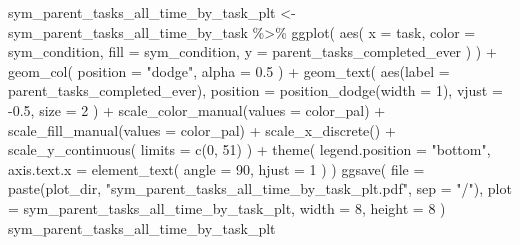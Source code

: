 \documentclass[
]{book}
\newenvironment{Shaded}{\begin{snugshade}}{\end{snugshade}}
\newcommand{\AttributeTok}[1]{\textcolor[rgb]{0.77,0.63,0.00}{#1}}
\newcommand{\DecValTok}[1]{\textcolor[rgb]{0.00,0.00,0.81}{#1}}
\newcommand{\FloatTok}[1]{\textcolor[rgb]{0.00,0.00,0.81}{#1}}
\newcommand{\FunctionTok}[1]{\textcolor[rgb]{0.00,0.00,0.00}{#1}}
\newcommand{\NormalTok}[1]{#1}
\newcommand{\OtherTok}[1]{\textcolor[rgb]{0.56,0.35,0.01}{#1}}
\newcommand{\SpecialCharTok}[1]{\textcolor[rgb]{0.00,0.00,0.00}{#1}}
\newcommand{\StringTok}[1]{\textcolor[rgb]{0.31,0.60,0.02}{#1}}
\begin{document}
\begin{Shaded}
\begin{Highlighting}[]
\NormalTok{sym\_parent\_tasks\_all\_time\_by\_task\_plt }\OtherTok{\textless{}{-}}\NormalTok{ sym\_parent\_tasks\_all\_time\_by\_task }\SpecialCharTok{\%\textgreater{}\%}
  \FunctionTok{ggplot}\NormalTok{(}
    \FunctionTok{aes}\NormalTok{(}
      \AttributeTok{x =}\NormalTok{ task,}
      \AttributeTok{color =}\NormalTok{ sym\_condition,}
      \AttributeTok{fill =}\NormalTok{ sym\_condition,}
      \AttributeTok{y =}\NormalTok{ parent\_tasks\_completed\_ever}
\NormalTok{    )}
\NormalTok{  ) }\SpecialCharTok{+}
  \FunctionTok{geom\_col}\NormalTok{(}
    \AttributeTok{position =} \StringTok{"dodge"}\NormalTok{,}
    \AttributeTok{alpha =} \FloatTok{0.5}
\NormalTok{  ) }\SpecialCharTok{+}
  \FunctionTok{geom\_text}\NormalTok{(}
    \FunctionTok{aes}\NormalTok{(}\AttributeTok{label =}\NormalTok{ parent\_tasks\_completed\_ever),}
    \AttributeTok{position =} \FunctionTok{position\_dodge}\NormalTok{(}\AttributeTok{width =} \DecValTok{1}\NormalTok{),}
    \AttributeTok{vjust =} \SpecialCharTok{{-}}\FloatTok{0.5}\NormalTok{,}
    \AttributeTok{size =} \DecValTok{2}
\NormalTok{  ) }\SpecialCharTok{+}
  \FunctionTok{scale\_color\_manual}\NormalTok{(}\AttributeTok{values =}\NormalTok{ color\_pal) }\SpecialCharTok{+}
  \FunctionTok{scale\_fill\_manual}\NormalTok{(}\AttributeTok{values =}\NormalTok{ color\_pal) }\SpecialCharTok{+}
  \FunctionTok{scale\_x\_discrete}\NormalTok{() }\SpecialCharTok{+}
  \FunctionTok{scale\_y\_continuous}\NormalTok{(}
    \AttributeTok{limits =} \FunctionTok{c}\NormalTok{(}\DecValTok{0}\NormalTok{, }\DecValTok{51}\NormalTok{)}
\NormalTok{  ) }\SpecialCharTok{+}
  \FunctionTok{theme}\NormalTok{(}
    \AttributeTok{legend.position =} \StringTok{"bottom"}\NormalTok{,}
    \AttributeTok{axis.text.x =} \FunctionTok{element\_text}\NormalTok{(}
      \AttributeTok{angle =} \DecValTok{90}\NormalTok{,}
      \AttributeTok{hjust =} \DecValTok{1}
\NormalTok{    )}
\NormalTok{  )}
\FunctionTok{ggsave}\NormalTok{(}
  \AttributeTok{file =} \FunctionTok{paste}\NormalTok{(plot\_dir, }\StringTok{"sym\_parent\_tasks\_all\_time\_by\_task\_plt.pdf"}\NormalTok{, }\AttributeTok{sep =} \StringTok{"/"}\NormalTok{),}
  \AttributeTok{plot =}\NormalTok{ sym\_parent\_tasks\_all\_time\_by\_task\_plt,}
  \AttributeTok{width =} \DecValTok{8}\NormalTok{,}
  \AttributeTok{height =} \DecValTok{8}
\NormalTok{)}
\NormalTok{sym\_parent\_tasks\_all\_time\_by\_task\_plt}
\end{Highlighting}
\end{Shaded}
\end{document}
